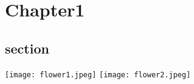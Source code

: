 \documentclass[../Lat-Book/Lat-Book.tex]{subfiles}
\begin{document}
\INIT

\chapter{Chapter1}
\section{section}
\texttt{[image: flower1.jpeg]}
\texttt{[image: flower2.jpeg]}
\end{document}
